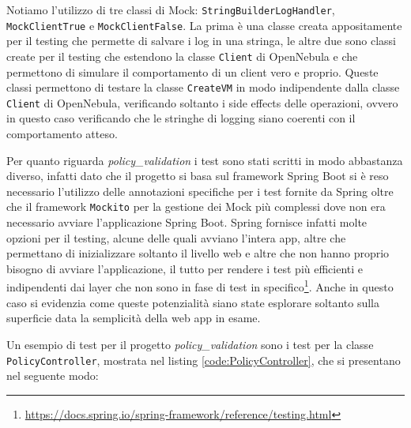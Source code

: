 Notiamo l'utilizzo di tre classi di Mock: \texttt{StringBuilderLogHandler}, \texttt{MockClientTrue} e \texttt{MockClientFalse}. La prima è una classe creata appositamente per il testing che permette di salvare i log in una stringa, le altre due sono classi create per il testing che estendono la classe \texttt{Client} di OpenNebula e che permettono di simulare il comportamento di un client vero e proprio. Queste classi permettono di testare la classe \texttt{CreateVM} in modo indipendente dalla classe \texttt{Client} di OpenNebula, verificando soltanto i side effects delle operazioni, ovvero in questo caso verificando che le stringhe di logging siano coerenti con il comportamento atteso.\par
Per quanto riguarda \emph{policy\_validation} i test sono stati scritti in modo abbastanza diverso, infatti dato che il progetto si basa sul framework Spring Boot si è reso necessario l'utilizzo delle annotazioni specifiche per i test fornite da Spring oltre che il framework \texttt{Mockito}\cite{mockito} per la gestione dei Mock più complessi dove non era necessario avviare l'applicazione Spring Boot. Spring fornisce infatti molte opzioni per il testing, alcune delle quali avviano l'intera app, altre che permettano di inizializzare soltanto il livello web e altre che non hanno proprio bisogno di avviare l'applicazione, il tutto per rendere i test più efficienti e indipendenti dai layer che non sono in fase di test in specifico\footnote{\url{https://docs.spring.io/spring-framework/reference/testing.html}}. Anche in questo caso si evidenzia come queste potenzialità siano state esplorare soltanto sulla superficie data la semplicità della web app in esame.\par
Un esempio di test per il progetto \emph{policy\_validation} sono i test per la classe \texttt{PolicyController}, mostrata nel listing \ref{code:PolicyController}, che si presentano nel seguente modo:
